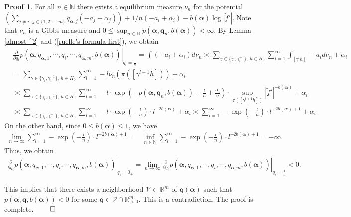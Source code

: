 \documentclass{article}
\theoremstyle{definition}
\newtheorem*{pf}{Proof}
\begin{document}
\begin{pf}
    For all $n\in\mathbb{N}$ there exists a equilibrium measure $\nu_n$ for the potential $(\sum_{j\neq i,\ j\in\lbrace1,2,\cdots,m\rbrace}q_{\boldsymbol{\alpha},j}(-a_j+\alpha_j))+1/n(-a_i+\alpha_i)-b(\boldsymbol{\alpha})\log|\tilde f'|$. Note that $\nu_n$ is a Gibbs measure and  $0\leq\sup_{n\in\mathbb{N}}p(\boldsymbol{\alpha},\boldsymbol{q}_n,b(\boldsymbol{\alpha}))<\infty$. By Lemma \ref{almost ^2} and (\ref{ruelle's formula first}), we obtain 
\begin{align}
&\left. \frac{\partial}{\partial q_i}p(\boldsymbol{\alpha},q_{\boldsymbol{\alpha},1},\cdots,q_i,\cdots,q_{\boldsymbol{\alpha},m},b(\boldsymbol{\alpha}))\right|_{q_i=\frac{1}{n}}\nonumber
=\int(-a_i+\alpha_i)d\nu_{n}
\asymp\sum_{\gamma\in\lbrace\gamma_i,\gamma_i^{-1}\rbrace,\ h\in H_0}\sum_{l= 1}^{\infty}\int_{[\gamma^lh]} -a_i d\nu_{n}+\alpha_i \nonumber \\
&=\sum_{\gamma\in\lbrace\gamma_i,\gamma_i^{-1}\rbrace,\ h\in H_0}\sum_{l= 1}^{\infty} -l \nu_{n}(\pi([\gamma^{l+1}h]))\nonumber+\alpha_i\\ \nonumber
&\asymp  \sum_{\gamma\in\lbrace\gamma_i,\gamma_i^{-1}\rbrace,\ h\in H_0}\sum_{l= 1}^{\infty}  -l\cdot \exp \left(-p(\boldsymbol{\alpha},\boldsymbol{q}_n,b(\boldsymbol{\alpha}))-\frac{l}{n} +\frac{\alpha_i}{n}\right)\cdot \sup_{\pi([\gamma^{l+1}h])} |\tilde f'|^{-b(\boldsymbol{\alpha})}+\alpha_i  \\   \nonumber
&\asymp  \sum_{\gamma\in\lbrace\gamma_i,\gamma_i^{-1}\rbrace,\ h\in H_0}\sum_{l= 1}^{\infty}  -l\cdot \exp\left(-\frac{l}{n} \right)\cdot l^{-2b(\boldsymbol{\alpha})}  +\alpha_i\nonumber
\asymp  \sum_{l= 1}^{\infty} -\exp\left(-\frac{l}{n}\right) \cdot l^{-2b(\boldsymbol{\alpha})+1}+\alpha_i
\end{align}
 On the other hand, since $0\leq b(\boldsymbol{\alpha})\leq1$, we have
\begin{align}
\lim_{n \to \infty} \sum_{l= 1}^{\infty} - \exp\left(-\frac{l}{n}\right) \cdot l^{-2b(\boldsymbol{\alpha})+1}=
&\inf_{n\in\mathbb{N}}\sum_{l= 1}^{\infty}-\exp\left(-\frac{l}{n}\right) \cdot l^{-2b(\boldsymbol{\alpha})+1}=-\infty \nonumber.
\end{align}
Thus, we obtain 
    \begin{align}
        \left. \frac{\partial}{\partial q_i}p(\boldsymbol{\alpha},q_{\boldsymbol{\alpha},1},\cdots,q_i,\cdots,q_{\boldsymbol{\alpha},m},b(\boldsymbol{\alpha}))\right|_{q_i=0_+}\nonumber
        =\lim_{n\to\infty}\left. \frac{\partial}{\partial q_i}p(\boldsymbol{\alpha},q_{\boldsymbol{\alpha},1},\cdots,q_i,\cdots,q_{\boldsymbol{\alpha},m},b(\boldsymbol{\alpha}))\right|_{q_i=\frac{1}{n}}<0.\nonumber
    \end{align}

    This implies that there exists a neighborhood $\mathcal{V}\subset \mathbb{R}^m$ of $\boldsymbol{q}(\boldsymbol{\alpha})$ such that
$p(\boldsymbol{\alpha},\boldsymbol{q},b(\boldsymbol{\alpha}))<0$ for some $\boldsymbol{q}\in\mathcal{V}\cap\mathbb{R}_{>0}^m$. This is a contradiction. The proof is complete.
$\qed$
\end{pf}
\end{document}
